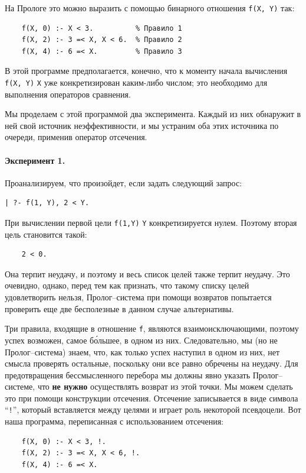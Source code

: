 \documentclass[12pt, openany, twoside]{book} %
\begin{document}
\noindent На Прологе это можно выразить с помощью бинарного отношения
\texttt{f(X, Y)} так:
{\tt \begin{verbatim}
    f(X, 0) :- X < 3.          % Правило 1
    f(X, 2) :- 3 =< X, X < 6.  % Правило 2
    f(X, 4) :- 6 =< X.         % Правило 3
\end{verbatim}}

В этой программе предполагается, конечно, что к моменту начала вычисления {\tt f(X, Y)} {\tt X} уже конкретизирован каким-либо числом; это необходимо для выполнения операторов сравнения.

Мы проделаем с этой программой два эксперимента. Каждый из них обнаружит в ней свой источник неэффективности, и мы устраним оба этих источника по очереди, применив оператор отсечения.

\paragraph{Эксперимент 1.} Проанализируем, что произойдет, если задать следующий запрос:
{\tt \begin{verbatim}
| ?- f(1, Y), 2 < Y.
\end{verbatim}}

При вычислении первой цели {\tt f(1,Y)} {\tt Y} конкретизируется нулем. Поэтому вторая цель становится такой:
{\tt \begin{verbatim}
    2 < 0.
\end{verbatim}}
\noindent Она терпит неудачу, и поэтому и весь список целей также терпит неудачу. Это очевидно, однако, перед тем как признать, что такому списку целей удовлетворить нельзя, Пролог--система при помощи возвратов попытается проверить еще две бесполезные в данном случае альтернативы.

Три правила, входящие в отношение {\tt f}, являются взаимоисключающими, поэтому успех возможен, самое б\'{о}льшее, в одном из них. Следовательно, мы (но не Пролог--система) знаем, что, как только успех наступил в одном из них, нет смысла проверять остальные, поскольку они все равно обречены на неудачу. Для предотвращения бессмысленного перебора мы должны явно указать Пролог--системе, что {\bf не нужно} осуществлять возврат из этой точки. Мы можем сделать это при помощи конструкции отсечения. Отсечение записывается в виде символа ``{\tt !}'', который вставляется между целями и играет роль некоторой псевдоцели. Вот наша программа, переписанная с использованием отсечения:

{\tt \begin{verbatim}
    f(X, 0) :- X < 3, !.
    f(X, 2) :- 3 =< X, X < 6, !.
    f(X, 4) :- 6 =< X.
\end{verbatim}}
\end{document}
